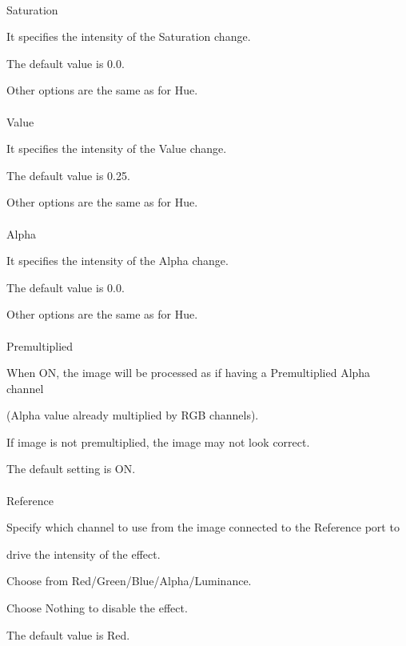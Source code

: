 \documentclass[a4paper,12pt]{article}
\begin{document}
\thispagestyle{empty}

\ \vspace{-0.2em}
\\
Saturation\par
It specifies the intensity of the Saturation change.\par
The default value is 0.0.\par
Other options are the same as for \textquotedbl Hue\textquotedbl .\\
\\
Value\par
It specifies the intensity of the Value change.\par
The default value is 0.25.\par
Other options are the same as for \textquotedbl Hue\textquotedbl .\\
\\
Alpha\par
It specifies the intensity of the Alpha change.\par
The default value is 0.0.\par
Other options are the same as for \textquotedbl Hue\textquotedbl .\\
\\
Premultiplied\par
When ON, the image will be processed as if having a Premultiplied Alpha channel\par 
(Alpha value already multiplied by RGB channels).\par
If image is not premultiplied, the image may not look correct.\par
The default setting is ON.\\
\\
Reference\par
Specify which channel to use from the image connected to the Reference port to\par 
drive the intensity of the effect.\par
Choose from Red/Green/Blue/Alpha/Luminance.\par
Choose Nothing to disable the effect.\par
The default value is \textquotedbl Red\textquotedbl .
\end{document}

